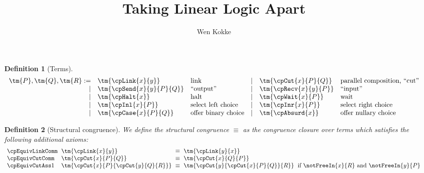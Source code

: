 \documentclass[submission,copyright,creativecommons]{eptcs}
\title{Taking Linear Logic Apart}
\author{%
  Wen Kokke
  \institute{University of Edinburgh\\ Edinburgh, Scotland}
  \email{wen.kokke@ed.ac.uk}}
\newtheorem{definition}{Definition}
\begin{document}
\maketitle

\begin{abstract}
\end{abstract}


\begin{definition}[Terms]\label{def:cp-terms}
  \begin{gather*}
    \begin{array}{rllrll}
      \tm{P}, \tm{Q}, \tm{R}
           :=& \tm{\cpLink{x}{y}}       &\text{link}
      &  \mid& \tm{\cpCut{x}{P}{Q}}     &\text{parallel composition, ``cut''}
      \\ \mid& \tm{\cpSend{x}{y}{P}{Q}} &\text{``output''}
      &  \mid& \tm{\cpRecv{x}{y}{P}}    &\text{``input''}
      \\ \mid& \tm{\cpHalt{x}}          &\text{halt}
      &  \mid& \tm{\cpWait{x}{P}}       &\text{wait}
      \\ \mid& \tm{\cpInl{x}{P}}        &\text{select left choice}
      &  \mid& \tm{\cpInr{x}{P}}        &\text{select right choice}
      \\ \mid& \tm{\cpCase{x}{P}{Q}}    &\text{offer binary choice}
      &  \mid& \tm{\cpAbsurd{x}}        &\text{offer nullary choice}
    \end{array}
  \end{gather*}
\end{definition}

\begin{definition}[Structural congruence]\label{def:cp-equiv}
  We define the structural congruence $\equiv$ as the congruence closure over
  terms which satisfies the following additional axioms:
  \begin{gather*}
    \setlength{\arraycolsep}{3pt}
    \begin{array}{llcll}
      \cpEquivLinkComm
      & \tm{\cpLink{x}{y}}
      & \equiv
      & \tm{\cpLink{y}{x}}
      \\
      \cpEquivCutComm
      & \tm{\cpCut{x}{P}{Q}}
      & \equiv
      & \tm{\cpCut{x}{Q}{P}}
      \\
      \cpEquivCutAss1
      & \tm{\cpCut{x}{P}{\cpCut{y}{Q}{R}}}
      & \equiv
      & \tm{\cpCut{y}{\cpCut{x}{P}{Q}}{R}}
      & \text{if }\notFreeIn{x}{R}\text{ and }\notFreeIn{y}{P}
    \end{array}
  \end{gather*}
\end{definition}
\end{document}
